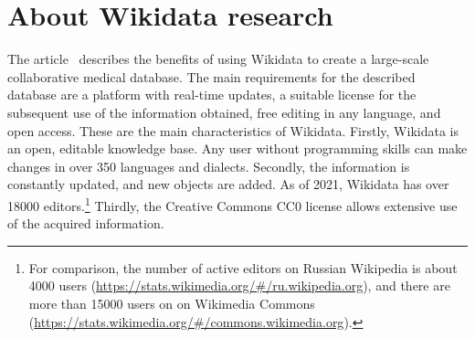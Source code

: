 \section{About Wikidata research}
The article~ describes the benefits of using Wikidata to create a large-scale collaborative medical database. The main requirements for the described database are a platform with real-time updates, a suitable license for the subsequent use of the information obtained, free editing in any language, and open access. These are the main characteristics of Wikidata. Firstly, Wikidata is an open, editable knowledge base. Any user without programming skills can make changes in over 350 languages and dialects. Secondly, the information is constantly updated, and new objects are added. As of 2021, Wikidata has over \num{18000} editors.\footnote{For comparison, the number of active editors on Russian Wikipedia
is about \num{4000} users (\href{https://stats.wikimedia.org/\#/ru.wikipedia.org}{https://stats.wikimedia.org/\#/ru.wikipedia.org}), and there are more than \num{15000} users on on Wikimedia Commons (\href{https://stats.wikimedia.org/\#/commons.wikimedia.org}{https://stats.wikimedia.org/\#/commons.wikimedia.org}).} Thirdly, the Creative Commons CC0 license allows extensive use of the acquired information.

